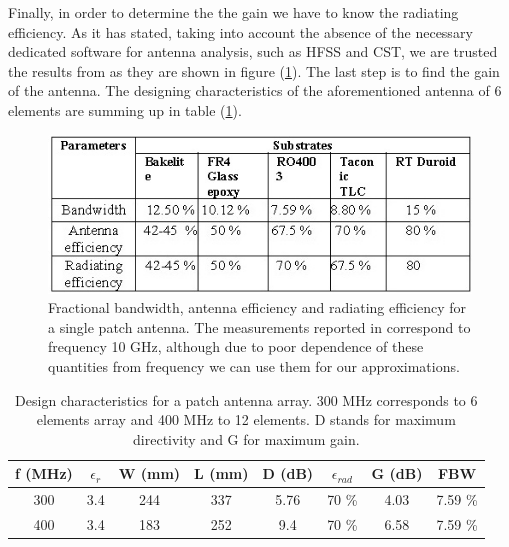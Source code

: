 Finally, in order to determine the the gain we have to know the radiating efficiency. As it has stated, taking into account the absence of the necessary dedicated software for antenna analysis, such as HFSS and CST, we are trusted the results from \cite{substrates} as they are shown in figure (\ref{array result}). The last step is to find the gain of the antenna. The designing characteristics of the aforementioned antenna of 6 elements are summing up in table (\ref{table: results}).

\begin{figure}[ht]
\centering
\includegraphics[width=.75\textwidth]{figures/Yannis/results.jpg}
\caption{Fractional bandwidth, antenna efficiency and radiating efficiency for a single patch antenna. The measurements reported in \cite{substrates} correspond to frequency 10 GHz, although due to poor dependence of these quantities from frequency we can use them for our approximations.}
\label{array result}
\end{figure}

\begin{table}[ht]
\centering
\begin{tabular}{| c | c | c | c | c | c | c | c |}
\hline
 \textbf{f (MHz)} & \textbf{$\epsilon_{r}$} & \textbf{W (mm)} & \textbf{L (mm)} & \textbf{D (dB)} & \textbf{$\epsilon_{rad}$} & \textbf{G (dB)} & FBW \\ 
 \hline
 300 & 3.4 & 244 & 337 & 5.76 & 70 \% & 4.03 & 7.59 \% \\
 \hline
 400 & 3.4 & 183 & 252 & 9.4 & 70 \% & 6.58 & 7.59 \% \\
 \hline
\end{tabular}
\caption{Design characteristics for a patch antenna array. 300 MHz corresponds to 6 elements array and 400 MHz to 12 elements. D stands for maximum directivity and G for maximum gain.}
\label{table: results}
\end{table}

